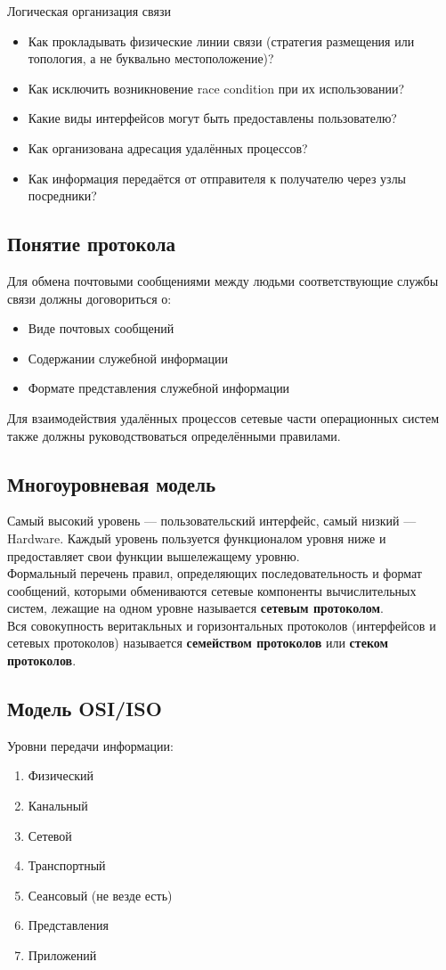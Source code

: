 \documentclass[12pt, a4paper]{article}
\begin{document}
    \begin{center}
        Логическая организация связи
    \end{center}
    \begin{itemize}
        \item Как прокладывать физические линии связи (стратегия размещения или топология, а не буквально местоположение)?
        \item Как исключить возникновение race condition при их использовании?
        \item Какие виды интерфейсов могут быть предоставлены пользователю?
        \item Как организована адресация удалённых процессов?
        \item Как информация передаётся от отправителя к получателю через узлы посредники?
    \end{itemize}
    \subsection{Понятие протокола}
    Для обмена почтовыми сообщениями между людьми соответствующие службы связи должны договориться о:
    \begin{itemize}
        \item Виде почтовых сообщений
        \item Содержании служебной информации
        \item Формате представления служебной информации
    \end{itemize}
    Для взаимодействия удалённых процессов сетевые части операционных систем также должны руководствоваться определёнными правилами.
    \subsection{Многоуровневая модель}
    Самый высокий уровень --- пользовательский интерфейс, самый низкий --- Hardware. Каждый уровень пользуется функционалом уровня ниже и предоставляет свои функции вышележащему уровню.\\
    Формальный перечень правил, определяющих последовательность и формат сообщений, которыми обмениваются сетевые компоненты вычислительных систем, лежащие на одном уровне называется \textbf{сетевым протоколом}.\\
    Вся совокупность веритакльных и горизонтальных протоколов (интерфейсов и сетевых протоколов) называется \textbf{семейством протоколов} или \textbf{стеком протоколов}.
    \subsection{Модель OSI/ISO}
    Уровни передачи информации:
    \begin{enumerate}
        \item Физический
        \item Канальный
        \item Сетевой
        \item Транспортный
        \item Сеансовый (не везде есть)
        \item Представления
        \item Приложений
    \end{enumerate}
\end{document}

